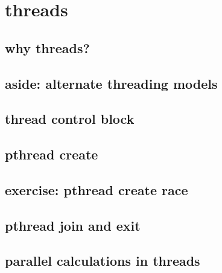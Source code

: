 
\section{threads}

\subsection{why threads?}



\subsection{aside: alternate threading models}



\subsection{thread control block}



\subsection{pthread create}



\subsection{exercise: pthread create race}



\subsection{pthread join and exit}



\subsection{parallel calculations in threads}







